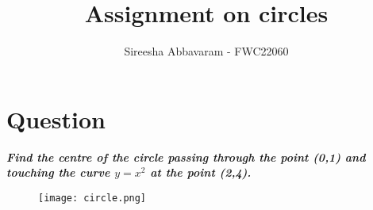 \documentclass[journal,12pt,twocolumn]
{IEEEtran}
\title{\textbf{\\Assignment on circles}}
\author{Sireesha Abbavaram - FWC22060}
\begin{document}
\maketitle


\section{Question}\vspace{2mm}
\textbf{\textit{Find the centre of the circle passing through the point (0,1) and touching the curve $y=x^2$ at the point (2,4).}}
\vspace{5mm}

\begin{figure}[h!]
\centering
\texttt{[image: circle.png]}
\centering
\end{figure}
\end{document}
